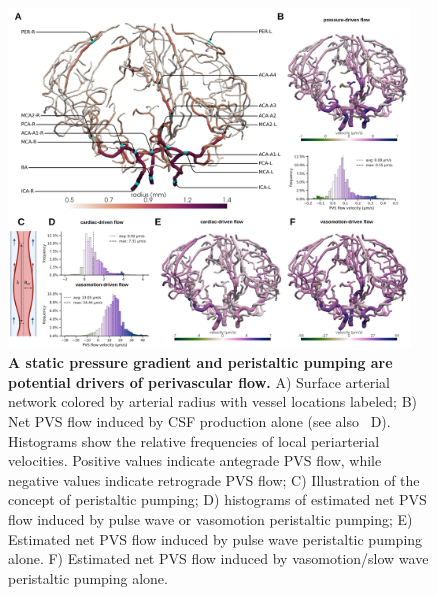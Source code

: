 \documentclass[fleqn,10pt]{wlscirep}
\begin{document}
\begin{figure}
    \centering
    \includegraphics[width=0.95\textwidth]{figures/figure3a.png}
    \caption{\textbf{A static pressure gradient and peristaltic pumping are potential drivers of perivascular flow.}
    A) Surface arterial network colored by arterial radius with vessel locations labeled;
    B) Net PVS flow induced by CSF production alone (see also ~D).
    Histograms show the relative frequencies of local periarterial velocities. Positive values indicate antegrade PVS flow, while negative values indicate retrograde PVS flow;
    C) Illustration of the concept of peristaltic pumping;
    D) histograms of estimated net PVS flow induced by pulse wave or vasomotion peristaltic pumping;
    E) Estimated net PVS flow induced by pulse wave peristaltic pumping alone.
    F) Estimated net PVS flow induced by vasomotion/slow wave peristaltic pumping alone.}
    \label{fig:pvs_a}
\end{figure}
    
\end{document}
